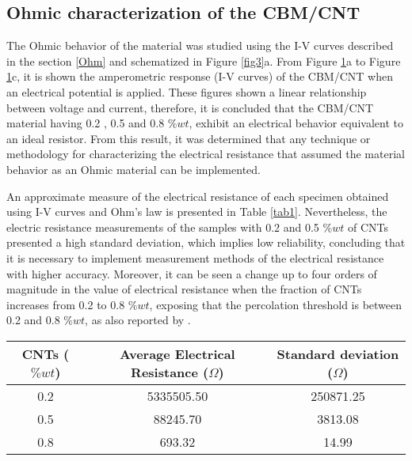 \documentclass[twocolumn]{bmcart}%
\begin{document}
\subsection{Ohmic characterization of the CBM/CNT}
The Ohmic behavior of the material was studied using the I-V curves described in the section \ref{Ohm} and schematized in Figure \ref{fig3}a. From Figure \ref{fig8}a to Figure \ref{fig8}c, it is shown the amperometric response (I-V curves) of the CBM/CNT when an electrical potential is applied. These figures shown a linear relationship between voltage and current, therefore, it is concluded that the CBM/CNT material having 0.2 , 0.5 and 0.8 $\%wt$, exhibit an electrical behavior equivalent to an ideal resistor. From this result, it was determined that any technique or methodology for characterizing the electrical resistance that assumed the material behavior as an Ohmic material can be implemented.  

\begin{figure}[h!]
  \caption{
      }
      \label{fig8}
      \end{figure}
  

An approximate measure of the electrical resistance of each specimen obtained using  I-V curves and Ohm's law is presented in Table \ref{tab1}. Nevertheless, the electric resistance measurements of the samples with 0.2  and 0.5 $\%wt$ of CNTs presented a high standard deviation, which implies low reliability, concluding that it is necessary to implement measurement methods of the electrical resistance with higher accuracy. Moreover, it can be seen a change up to four orders of magnitude in the value of electrical resistance when the fraction of CNTs increases from 0.2  to 0.8 $\%wt$, exposing that the percolation threshold is between 0.2 and 0.8 $\%wt$, as also reported by \citet{Garcia-Macias2017}.

\begin{table*}[ht]
\caption{Electrical resistance values and their corresponding standard deviations obtained from the I-V curves characterization.}
\centering
\begin{tabular}{|c|c|c|}
\hline
\textbf{CNTs ($\% wt$)} & \textbf{Average Electrical Resistance ($\Omega$)} & \textbf{Standard deviation ($\Omega$)}\\
\hline
0.2 & 5335505.50 & 250871.25\\
\hline
0.5 & 88245.70 & 3813.08\\
\hline 
0.8 & 693.32 & 14.99\\
\hline 

\end{tabular}
\label{tab1}
\end{table*}
\end{document}
